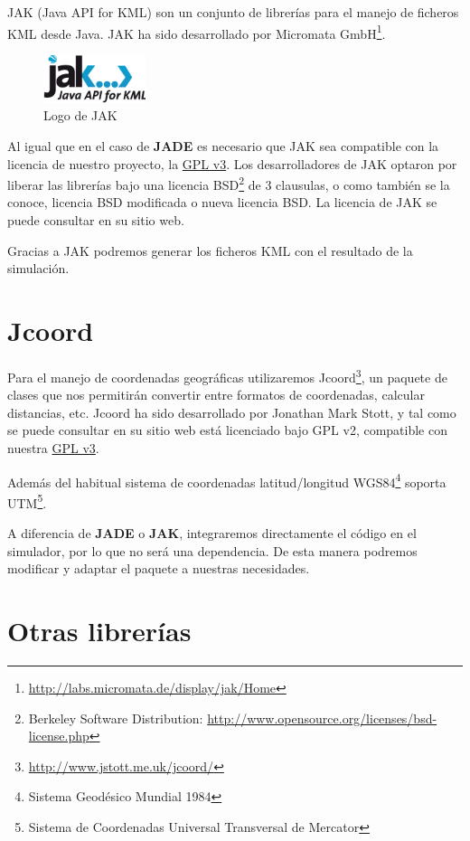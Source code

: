 JAK (Java API for KML) son un conjunto de librerías para el manejo de ficheros
KML desde Java. JAK ha sido desarrollado por Micromata
GmbH\footnote{\url{http://labs.micromata.de/display/jak/Home}}.

\begin{figure}[H]
 \centering
 \includegraphics[width=30mm]{figuras/cap4/jak.png}
 \caption{Logo de JAK}
\end{figure}

Al igual que en el caso de {\bf JADE} es necesario que JAK sea compatible con
la licencia de nuestro proyecto, la \hyperref[ap1]{GPL v3}.
Los desarrolladores de JAK optaron por liberar las librerías bajo una licencia
BSD\footnote{Berkeley Software Distribution:
\url{http://www.opensource.org/licenses/bsd-license.php}} de 3 clausulas, o como
también se la conoce, licencia BSD modificada o nueva licencia BSD. La licencia
de JAK se puede consultar en su sitio web.

Gracias a JAK podremos generar los ficheros KML con el resultado de la
simulación.

\section*{Jcoord}

Para el manejo de coordenadas geográficas utilizaremos
Jcoord\footnote{\url{http://www.jstott.me.uk/jcoord/}}, un paquete de clases que
nos permitirán convertir entre formatos de coordenadas, calcular distancias,
etc. Jcoord ha sido desarrollado por Jonathan Mark Stott, y tal como se puede
consultar en su sitio web está licenciado bajo GPL v2, compatible con nuestra
\hyperref[ap1]{GPL v3}.

Además del habitual sistema de coordenadas latitud/longitud
WGS84\footnote{Sistema Geodésico Mundial 1984} soporta UTM\footnote{Sistema de
Coordenadas Universal Transversal de Mercator}.

A diferencia de {\bf JADE} o {\bf JAK}, integraremos directamente el código en
el simulador, por lo que no será una dependencia. De esta manera podremos
modificar y adaptar el paquete a nuestras necesidades.

\section*{Otras librerías}

